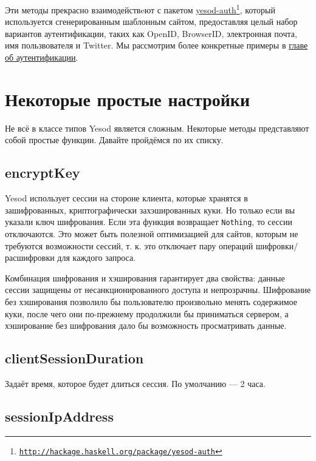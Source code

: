 Эти методы прекрасно взаимодействeют с пакетом \href{http://hackage.haskell.org/package/yesod-auth}{yesod-auth}\footnote{\href{http://hackage.haskell.org/package/yesod-auth}{\texttt{http://hackage.haskell.org/package/yesod-auth}}}, который используется сгенерированным шаблонным сайтом, предоставляя целый набор вариантов аутентификации, таких как OpenID, BrowserID, электронная почта, имя пользвователя и Twitter. Мы рассмотрим более конкретные примеры в \hyperref[ch:auth]{главе об аутентификации}.

\section {Некоторые простые настройки}

Не всё в классе типов Yesod является сложным. Некоторые методы представляют собой простые функции. Давайте пройдёмся по их списку.

\subsection {encryptKey}

Yesod использует сессии на стороне клиента, которые хранятся в зашифрованных, криптографически захэшированных куки. Но только если вы указали ключ шифрования. Если эта функция возвращает \lstinline!Nothing!, то сессии отключаются. Это может быть полезной оптимизацией для сайтов, которым не требуются возможности сессий, т. к. это отключает пару операций шифровки/расшифровки для каждого запроса.

\begin{remark}
Комбинация шифрования и хэширования гарантирует два свойства: данные сессии защищены от несанкционированного доступа и непрозрачны. Шифрование без хэширования позволило бы пользователю произвольно менять содержимое куки, после чего они по-прежнему продолжили бы приниматься сервером, а хэширование без шифрования дало бы возможность просматривать данные.
\end{remark}

\subsection {clientSessionDuration}

Задаёт время, которое будет длиться сессия. По умолчанию --- 2 часа.

\subsection {sessionIpAddress}

